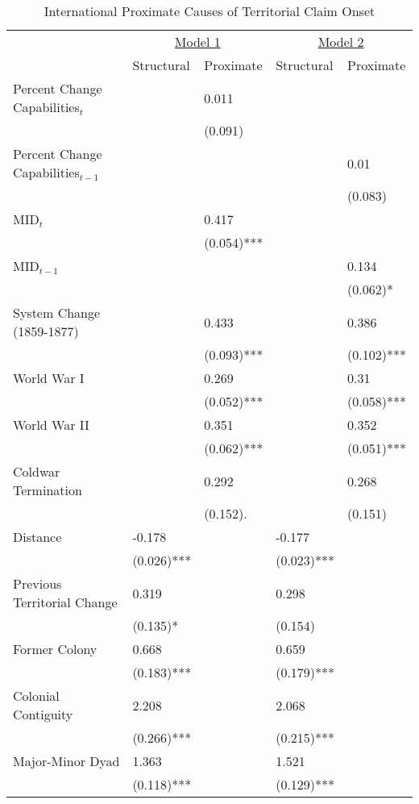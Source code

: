 \begin{table}[htpb]
	\caption{International Proximate Causes of Territorial Claim Onset \label{tab_i}}
	\centering
	\begin{tabular}{lllll}
		\hline
		& \multicolumn{2}{c}{\underline{Model 1}} & \multicolumn{2}{c}{\underline{Model 2}} \\
		& Structural & Proximate & Structural & Proximate \\ \hline
		Percent Change Capabilities$_{t}$ &  & 0.011 &  &  \\ 
		&  & (0.091)  &  &  \\ 
		Percent Change Capabilities$_{t-1}$ &  &  &  & 0.01 \\ 
		&  &  &  & (0.083)  \\ 
		MID$_{t}$ &  & 0.417 &  &  \\ 
		&  & (0.054)*** &  &  \\ 
		MID$_{t-1}$ &  &  &  & 0.134 \\ 
		&  &  &  & (0.062)* \\ 
		System Change (1859-1877) &  & 0.433 &  & 0.386 \\ 
		&  & (0.093)*** &  & (0.102)*** \\ 
		World War I &  & 0.269 &  & 0.31 \\ 
		&  & (0.052)*** &  & (0.058)*** \\ 
		World War II &  & 0.351 &  & 0.352 \\ 
		&  & (0.062)*** &  & (0.051)*** \\ 
		Coldwar Termination &  & 0.292 &  & 0.268 \\ 
		&  & (0.152). &  & (0.151) \\ 
		Distance & -0.178 &  & -0.177 &  \\ 
		& (0.026)*** &  & (0.023)*** &  \\ 
		Previous Territorial Change & 0.319 &  & 0.298 &  \\ 
		& (0.135)* &  & (0.154) &  \\ 
		Former Colony & 0.668 &  & 0.659 &  \\ 
		& (0.183)*** &  & (0.179)*** &  \\ 
		Colonial Contiguity & 2.208 &  & 2.068 &  \\ 
		& (0.266)*** &  & (0.215)*** &  \\ 
		Major-Minor Dyad & 1.363 &  & 1.521 &  \\ 
		& (0.118)*** &  & (0.129)*** &  \\ 

\end{tabular}
\end{table}
